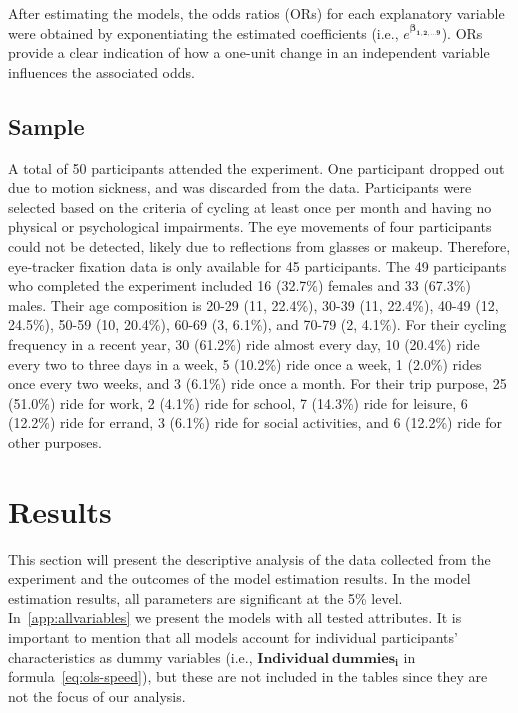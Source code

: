 \documentclass[3p,authoryear]{elsarticle}
\begin{document}
After estimating the models, the odds ratios (ORs) for each explanatory variable
were obtained by exponentiating the estimated coefficients (i.e.,
$e^{\bm{\beta_{1,2,\ldots 9}}}$). ORs provide a clear indication of how a
one-unit change in an independent variable influences the associated odds.

\subsection{Sample}
A total of 50 participants attended the experiment. One participant dropped out
due to motion sickness, and was discarded from the data. Participants were
selected based on the criteria of cycling at least once per month and having no
physical or psychological impairments. The eye movements of four participants
could not be detected, likely due to reflections from glasses or makeup.
Therefore, eye-tracker fixation data is only available for 45 participants. The
49 participants who completed the experiment included 16 (32.7\%) females and 33
(67.3\%) males. Their age composition is 20-29 (11, 22.4\%), 30-39 (11, 22.4\%),
40-49 (12, 24.5\%), 50-59 (10, 20.4\%), 60-69 (3, 6.1\%), and 70-79 (2, 4.1\%).
For their cycling frequency in a recent year, 30 (61.2\%) ride almost every day,
10 (20.4\%) ride every two to three days in a week, 5 (10.2\%) ride once a week,
1 (2.0\%) rides once every two weeks, and 3 (6.1\%) ride once a month. For their
trip purpose, 25 (51.0\%) ride for work, 2 (4.1\%) ride for school, 7 (14.3\%)
ride for leisure, 6 (12.2\%) ride for errand, 3 (6.1\%) ride for social
activities, and 6 (12.2\%) ride for other purposes.

\section{Results}\label{sec:results}
This section will present the descriptive analysis of the data collected from
the experiment and the outcomes of the model estimation results. In the model
estimation results, all parameters are significant at the 5\% level. In~\ref{app:allvariables} we
present the models with all tested
attributes. It is important to mention that all models account for individual
participants' characteristics as dummy variables (i.e.,
$\bm{Individual\ dummies_i}$ in formula~\eqref{eq:ols-speed}), but these
are not included in the tables since they are not the focus of our analysis.
\end{document}
